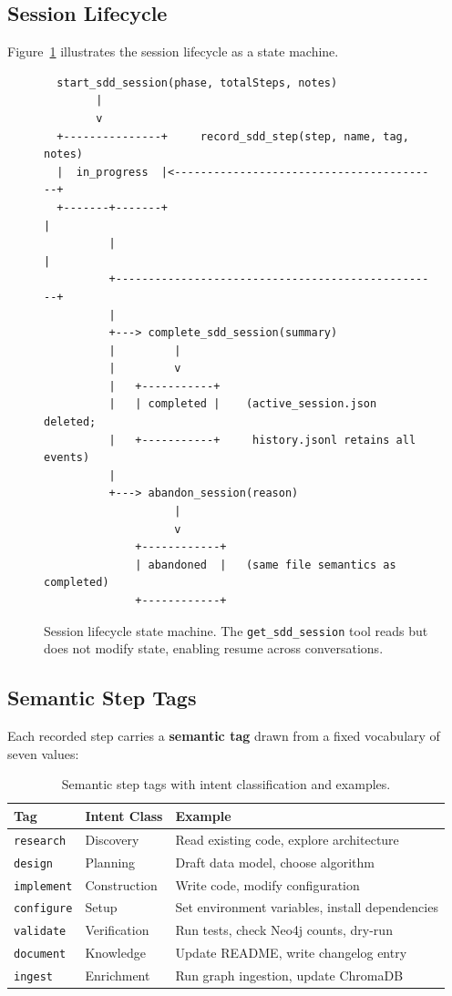 \documentclass[11pt,letterpaper]{article}
\begin{document}
\subsection{Session Lifecycle}

Figure~\ref{fig:lifecycle} illustrates the session lifecycle as a state
machine.

\begin{figure}[h]
\centering
\begin{verbatim}
  start_sdd_session(phase, totalSteps, notes)
        |
        v
  +---------------+     record_sdd_step(step, name, tag, notes)
  |  in_progress  |<-----------------------------------------+
  +-------+-------+                                          |
          |                                                  |
          +--------------------------------------------------+
          |
          +---> complete_sdd_session(summary)
          |         |
          |         v
          |   +-----------+
          |   | completed |    (active_session.json deleted;
          |   +-----------+     history.jsonl retains all events)
          |
          +---> abandon_session(reason)
                    |
                    v
              +------------+
              | abandoned  |   (same file semantics as completed)
              +------------+
\end{verbatim}
\caption{Session lifecycle state machine.  The \texttt{get\_sdd\_session}
tool reads but does not modify state, enabling resume across conversations.}
\label{fig:lifecycle}
\end{figure}

\subsection{Semantic Step Tags}
\label{sec:tags}

Each recorded step carries a \textbf{semantic tag} drawn from a fixed
vocabulary of seven values:

\begin{table}[h]
\centering
\caption{Semantic step tags with intent classification and examples.}
\label{tab:tags}
\begin{tabular}{@{}llp{6cm}@{}}
\toprule
\textbf{Tag} & \textbf{Intent Class} & \textbf{Example} \\
\midrule
\texttt{research}   & Discovery    & Read existing code, explore architecture \\
\texttt{design}     & Planning     & Draft data model, choose algorithm \\
\texttt{implement}  & Construction & Write code, modify configuration \\
\texttt{configure}  & Setup        & Set environment variables, install dependencies \\
\texttt{validate}   & Verification & Run tests, check Neo4j counts, dry-run \\
\texttt{document}   & Knowledge    & Update README, write changelog entry \\
\texttt{ingest}     & Enrichment   & Run graph ingestion, update ChromaDB \\
\bottomrule
\end{tabular}
\end{table}
\end{document}

